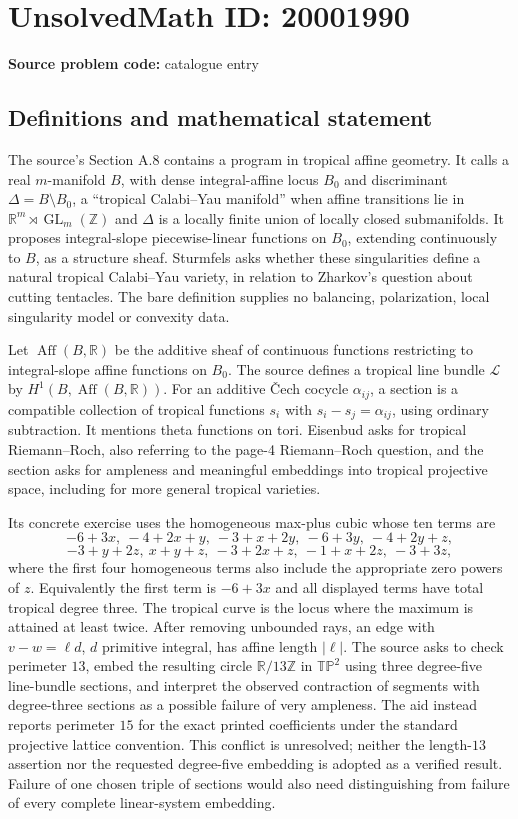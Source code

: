 \documentclass[11pt]{article}
\newcommand{\Z}{\mathbb{Z}}
\newcommand{\R}{\mathbb{R}}
\begin{document}
\section*{UnsolvedMath ID: 20001990}
\textbf{Source problem code:} catalogue entry
\subsection{Definitions and mathematical statement}
The source's Section A.8 contains a program in tropical affine geometry. It calls a real \(m\)-manifold \(B\), with dense integral-affine locus \(B_0\) and discriminant \(\Delta=B\setminus B_0\), a ``tropical Calabi--Yau manifold'' when affine transitions lie in \(\R^m\rtimes\operatorname{GL}_m(\Z)\) and \(\Delta\) is a locally finite union of locally closed submanifolds. It proposes integral-slope piecewise-linear functions on \(B_0\), extending continuously to \(B\), as a structure sheaf. Sturmfels asks whether these singularities define a natural tropical Calabi--Yau variety, in relation to Zharkov's question about cutting tentacles. The bare definition supplies no balancing, polarization, local singularity model or convexity data.

Let \(\operatorname{Aff}(B,\R)\) be the additive sheaf of continuous functions restricting to integral-slope affine functions on \(B_0\). The source defines a tropical line bundle \(\mathcal L\) by \(H^1(B,\operatorname{Aff}(B,\R))\). For an additive \v{C}ech cocycle \(\alpha_{ij}\), a section is a compatible collection of tropical functions \(s_i\) with \(s_i-s_j=\alpha_{ij}\), using ordinary subtraction. It mentions theta functions on tori. Eisenbud asks for tropical Riemann--Roch, also referring to the page-4 Riemann--Roch question, and the section asks for ampleness and meaningful embeddings into tropical projective space, including for more general tropical varieties.

Its concrete exercise uses the homogeneous max-plus cubic whose ten terms are
\[
 -6+3x,\ -4+2x+y,\ -3+x+2y,\ -6+3y,\ -4+2y+z,
\]
\[
 -3+y+2z,\ x+y+z,\ -3+2x+z,\ -1+x+2z,\ -3+3z,
\]
where the first four homogeneous terms also include the appropriate zero powers of \(z\). Equivalently the first term is \(-6+3x\) and all displayed terms have total tropical degree three. The tropical curve is the locus where the maximum is attained at least twice. After removing unbounded rays, an edge with \(v-w=\ell d\), \(d\) primitive integral, has affine length \(|\ell|\). The source asks to check perimeter \(13\), embed the resulting circle \(\R/13\Z\) in \(\mathbb{TP}^2\) using three degree-five line-bundle sections, and interpret the observed contraction of segments with degree-three sections as a possible failure of very ampleness. The aid instead reports perimeter \(15\) for the exact printed coefficients under the standard projective lattice convention. This conflict is unresolved; neither the length-\(13\) assertion nor the requested degree-five embedding is adopted as a verified result. Failure of one chosen triple of sections would also need distinguishing from failure of every complete linear-system embedding.
\end{document}
